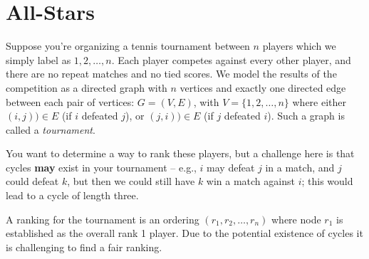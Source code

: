 \section{All-Stars}

Suppose you're organizing a tennis tournament between $n$ players which we simply label as $1,2, \ldots ,n$. Each player competes against every other player, and there are no repeat matches and no tied scores. We model the results of the competition as a directed graph with $n$ vertices and exactly one directed edge between each pair of vertices: $G=(V,E)$, with $V =\{1,2, \ldots ,n\}$ where either $(i,j)) \in E$ (if $i$ defeated $j$), or $(j,i)) \in E$ (if $j$ defeated $i$). Such a graph is called a \emph{tournament}.
		
You want to determine a way to rank these players, but a challenge here is that cycles \textbf{may} exist in your tournament -- e.g., $i$ may defeat $j$ in a match, and $j$ could defeat $k$, but then we could still have $k$ win a match against $i$; this  would lead to a cycle of length three. 

A ranking for the tournament is an ordering $(r_1,r_2, \ldots ,r_n)$ where node $r_1$ is established as the overall rank 1 player. Due to the potential existence of cycles it is challenging to find a fair ranking.



